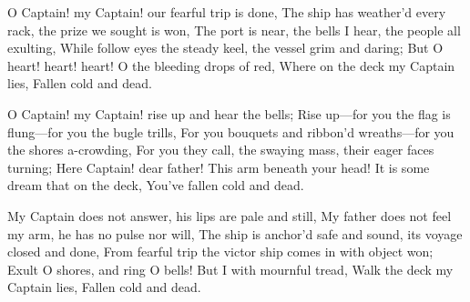 \documentclass[fontsize=9, a5paper]{scrbook}
\newcommand\blankpage{%
    \null
    \thispagestyle{empty}%
    \addtocounter{page}{-1}%
    \newpage}
\begin{document}
\afterpage{\blankpage}
\begin{poem}
	\begin{stanza}
		O Captain! my Captain! our fearful trip is done,\verseline
		The ship has weather’d every rack, the prize we sought is won,\verseline
		The port is near, the bells I hear, the people all exulting,\verseline
		While follow eyes the steady keel, the vessel grim and daring;\verseline
		                         \verseindent But O heart! heart! heart!\verseline
		                          \verseindent \verseindent O the bleeding drops of red,\verseline
		                           \verseindent \verseindent \verseindent Where on the deck my Captain lies,\verseline
		                                 \verseindent \verseindent \verseindent \verseindent Fallen cold and dead.
	\end{stanza}
	
	\begin{stanza}
		O Captain! my Captain! rise up and hear the bells;\verseline
		Rise up—for you the flag is flung—for you the bugle trills,\verseline
		For you bouquets and ribbon’d wreaths—for you the shores a-crowding,\verseline
		For you they call, the swaying mass, their eager faces turning;\verseline
		                         \verseindent Here Captain! dear father!\verseline
		                            \verseindent \verseindent This arm beneath your head!\verseline
		                               \verseindent \verseindent \verseindent It is some dream that on the deck,\verseline
		                                 \verseindent \verseindent \verseindent \verseindent You’ve fallen cold and dead.
	\end{stanza}
	
	\begin{stanza}
		My Captain does not answer, his lips are pale and still,\verseline
		My father does not feel my arm, he has no pulse nor will,\verseline
		The ship is anchor’d safe and sound, its voyage closed and done,\verseline
		From fearful trip the victor ship comes in with object won;\verseline
		                         \verseindent Exult O shores, and ring O bells!\verseline
		                            \verseindent \verseindent But I with mournful tread,\verseline
		                               \verseindent \verseindent \verseindent Walk the deck my Captain lies,\verseline
		                                  \verseindent \verseindent \verseindent \verseindent Fallen cold and dead.
	\end{stanza}
\end{poem}
\end{document}
